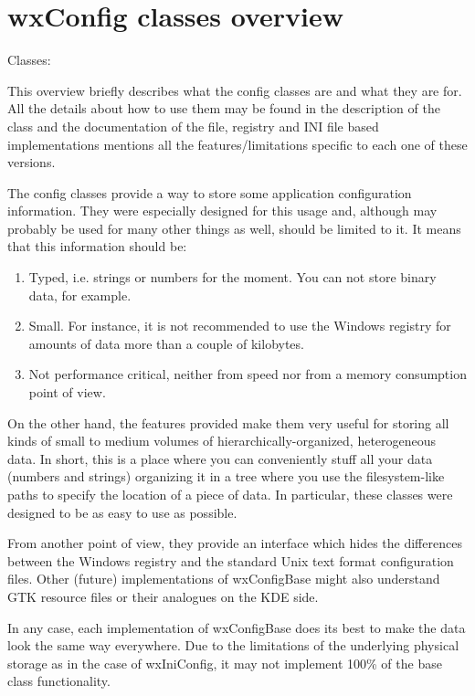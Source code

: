 \section{wxConfig classes overview}\label{wxconfigoverview}

Classes: 

This overview briefly describes what the config classes are and what they are
for. All the details about how to use them may be found in the description of
the  class and the documentation of the
file, registry and INI file based implementations mentions all the
features/limitations specific to each one of these versions.

The config classes provide a way to store some application configuration
information. They were especially designed for this usage and, although may
probably be used for many other things as well, should be limited to it. It
means that this information should be:

\begin{enumerate}\itemsep=0pt
\item Typed, i.e. strings or numbers for the moment. You can not store
binary data, for example.
\item Small. For instance, it is not recommended to use the Windows
registry for amounts of data more than a couple of kilobytes.
\item Not performance critical, neither from speed nor from a memory
consumption point of view.
\end{enumerate}

On the other hand, the features provided make them very useful for storing all
kinds of small to medium volumes of hierarchically-organized, heterogeneous
data. In short, this is a place where you can conveniently stuff all your data
(numbers and strings) organizing it in a tree where you use the
filesystem-like paths to specify the location of a piece of data. In
particular, these classes were designed to be as easy to use as possible.

From another point of view, they provide an interface which hides the
differences between the Windows registry and the standard Unix text format
configuration files. Other (future) implementations of wxConfigBase might also
understand GTK resource files or their analogues on the KDE side.

In any case, each implementation of wxConfigBase does its best to
make the data look the same way everywhere. Due
to the limitations of the underlying physical storage as in the case of
wxIniConfig, it may not implement 100\% of the base class functionality.

